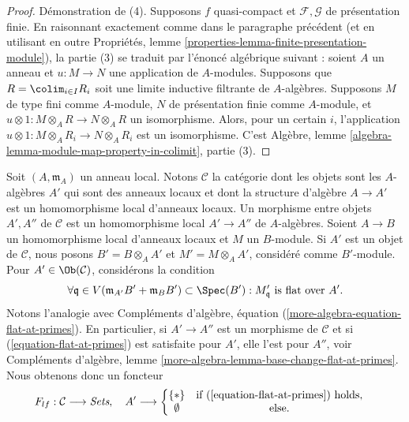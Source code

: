 \begin{proof}
\medskip\noindent
Démonstration de (4).
Supposons $f$ quasi-compact et $\mathcal{F}, \mathcal{G}$ de présentation finie.
En raisonnant exactement comme dans le paragraphe précédent
(et en utilisant en outre
Propriétés, lemme \ref{properties-lemma-finite-presentation-module}),
la partie (3) se traduit par l'énoncé algébrique suivant :
soient $A$ un anneau et $u : M \to N$ une application de $A$-modules.
Supposons que $R = \colim_{i \in I} R_i$ soit une limite inductive filtrante
de $A$-algèbres. Supposons $M$ de type fini comme $A$-module, $N$ de présentation
finie comme $A$-module, et
$u \otimes 1 : M \otimes_A R \to N \otimes_A R$ un isomorphisme.
Alors, pour un certain $i$, l'application
$u \otimes 1 : M \otimes_A R_i \to N \otimes_A R_i$ est un isomorphisme.
C'est
Algèbre, lemme \ref{algebra-lemma-module-map-property-in-colimit}, partie (3).
\end{proof}

\begin{situation}
\label{situation-flat-at-point}
Soit $(A, \mathfrak m_A)$ un anneau local.
Notons $\mathcal{C}$ la catégorie dont les objets sont les $A$-algèbres
$A'$ qui sont des anneaux locaux et dont la structure d'algèbre
$A \to A'$ est un homomorphisme local d'anneaux locaux.
Un morphisme entre objets $A', A''$ de $\mathcal{C}$ est un
homomorphisme local $A' \to A''$ de $A$-algèbres.
Soient $A \to B$ un homomorphisme local d'anneaux locaux et $M$ un $B$-module.
Si $A'$ est un objet de $\mathcal{C}$, nous posons $B' = B \otimes_A A'$
et $M' = M \otimes_A A'$, considéré comme $B'$-module.
Pour $A' \in \Ob(\mathcal{C})$, considérons la condition
\begin{equation}
\label{equation-flat-at-primes}
\forall \mathfrak q \in V(\mathfrak m_{A'}B' + \mathfrak m_B B')
\subset \Spec(B') :
M'_{\mathfrak q}\text{ is flat over }A'.
\end{equation}
Notons l'analogie avec
Compléments d'algèbre, équation (\ref{more-algebra-equation-flat-at-primes}).
En particulier, si $A' \to A''$ est un morphisme de $\mathcal{C}$ et si
(\ref{equation-flat-at-primes}) est satisfaite pour $A'$, elle l'est pour $A''$, voir
Compléments d'algèbre,
lemme \ref{more-algebra-lemma-base-change-flat-at-primes}.
Nous obtenons donc un foncteur
\begin{equation}
\label{equation-flat-at-point}
F_{lf} : \mathcal{C} \longrightarrow \textit{Sets}, \quad
A' \longrightarrow \left\{
\begin{matrix}
\{*\} & \text{if }(\ref{equation-flat-at-primes})\text{ holds}, \\
\emptyset & \text{else.} &
\end{matrix}
\right.
\end{equation}
\end{situation}

